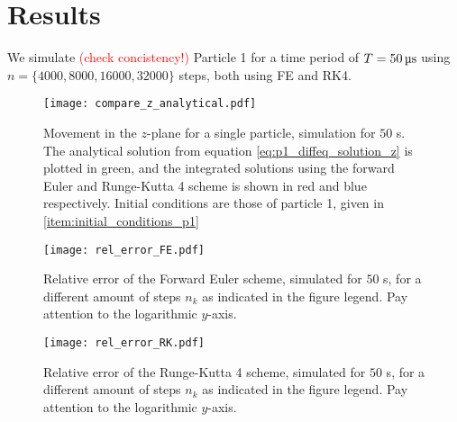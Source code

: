\section{Results}\label{sec:results}



We simulate \textcolor{red}{(check concistency!)} Particle 1 for a time period of $T = 50 \,\mathrm{\text{\textmu} s}$ using $n=\{4000, 8000, 16000, 32000 \}$ steps, both using FE and RK4. %


\begin{figure}
    \texttt{[image: compare\_z\_analytical.pdf]}
    \caption{Movement in the $z$-plane for a single particle, simulation for $50$ \textmu s. The analytical solution from equation \ref{eq:p1_diffeq_solution_z} is plotted in green, and the integrated solutions using the forward Euler and Runge-Kutta 4 scheme is shown in red and blue respectively. Initial conditions are those of particle 1, given in \ref{item:initial_conditions_p1} }
    \label{fig:compare_z_analytical}
\end{figure}


\begin{figure}
    \texttt{[image: rel\_error\_FE.pdf]}
    \caption{Relative error of the Forward Euler scheme, simulated for $50$ \textmu s, for a different amount of steps $n_k$ as indicated in the figure legend. Pay attention to the logarithmic $y$-axis.}
    \label{fig:error_FE}
\end{figure}


\begin{figure}
    \texttt{[image: rel\_error\_RK.pdf]}
    \caption{Relative error of the Runge-Kutta 4 scheme, simulated for $50$ \textmu s, for a different amount of steps $n_k$ as indicated in the figure legend. Pay attention to the logarithmic $y$-axis.}
    \label{fig:error_RK}
\end{figure}

